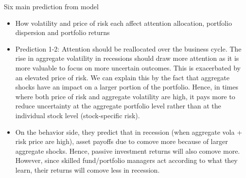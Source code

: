 Six main prediction from model
\begin{itemize}
    \item How volatility and price of risk each affect attention allocation, portfolio dispersion and portfolio returns
    \item Prediction 1-2: Attention should be reallocated over the business cycle. The rise in aggregate volatility in recessions should draw more attention as it is more valuable to focus on more uncertain outcomes. This is exacerbated by an elevated price of risk. We can explain this by the fact that aggregate shocks have an impact on a larger portion of the portfolio. Hence, in times where both price of risk and aggregate volatility are high, it pays more to reduce uncertainty at the aggregate portfolio level rather than at the individual stock level (stock-specific risk).
    \item On the behavior side, they predict that in recession (when aggregate vola + risk price are high), asset payoffs due to comove more because of larger aggregate shocks. Hence, passive investment returns will also comove more. However, since skilled fund/portfolio managers act according to what they learn, their returns will comove less in recession.
\end{itemize}

